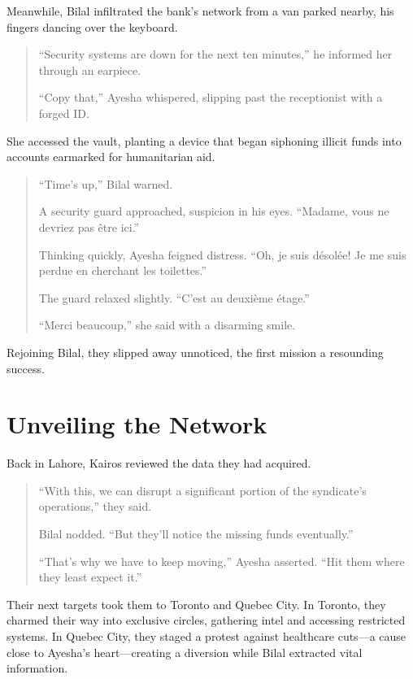 \documentclass[12pt]{book}
\begin{document}
Meanwhile, Bilal infiltrated the bank's network from a van parked nearby, his fingers dancing over the keyboard.

\begin{quote}
    ``Security systems are down for the next ten minutes,'' he informed her through an earpiece.

    ``Copy that,'' Ayesha whispered, slipping past the receptionist with a forged ID.
\end{quote}

She accessed the vault, planting a device that began siphoning illicit funds into accounts earmarked for humanitarian aid.

\begin{quote}
    ``Time's up,'' Bilal warned.

    A security guard approached, suspicion in his eyes. ``Madame, vous ne devriez pas être ici.''

    Thinking quickly, Ayesha feigned distress. ``Oh, je suis désolée! Je me suis perdue en cherchant les toilettes.''

    The guard relaxed slightly. ``C'est au deuxième étage.''

    ``Merci beaucoup,'' she said with a disarming smile.
\end{quote}

Rejoining Bilal, they slipped away unnoticed, the first mission a resounding success.

\chapter{Unveiling the Network}

Back in Lahore, Kairos reviewed the data they had acquired.

\begin{quote}
    ``With this, we can disrupt a significant portion of the syndicate's operations,'' they said.

    Bilal nodded. ``But they'll notice the missing funds eventually.''

    ``That's why we have to keep moving,'' Ayesha asserted. ``Hit them where they least expect it.''
\end{quote}

Their next targets took them to Toronto and Quebec City. In Toronto, they charmed their way into exclusive circles, gathering intel and accessing restricted systems. In Quebec City, they staged a protest against healthcare cuts—a cause close to Ayesha's heart—creating a diversion while Bilal extracted vital information.
\end{document}
